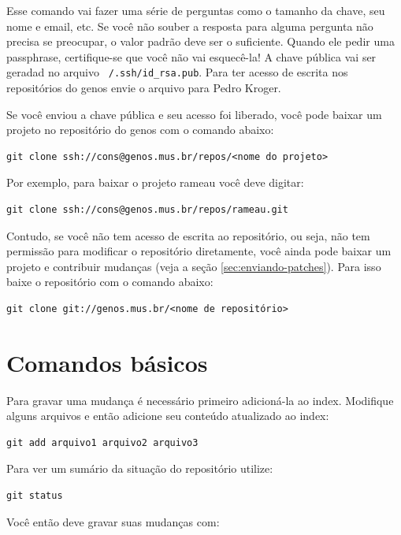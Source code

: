 \documentclass[12pt,brazil]{book}
\begin{document}
Esse comando vai fazer uma série de perguntas como o tamanho da chave,
seu nome e email, etc. Se você não souber a resposta para alguma
pergunta não precisa se preocupar, o valor padrão deve ser o
suficiente. Quando ele pedir uma passphrase, certifique-se que você
não vai esquecê-la! A chave pública vai ser geradad no arquivo
\texttt{~/.ssh/id\_rsa.pub}. Para ter acesso de escrita nos
repositórios do genos envie o arquivo para Pedro Kroger.

Se você enviou a chave pública e seu acesso foi liberado, você pode
baixar um projeto no repositório do genos com o comando abaixo:

\begin{verbatim}
git clone ssh://cons@genos.mus.br/repos/<nome do projeto>
\end{verbatim}

Por exemplo, para baixar o projeto rameau você deve
digitar:

\begin{verbatim}
git clone ssh://cons@genos.mus.br/repos/rameau.git
\end{verbatim}

Contudo, se você não tem acesso de escrita ao repositório, ou seja,
não tem permissão para modificar o repositório diretamente, você ainda
pode baixar um projeto e contribuir mudanças (veja a seção
\ref{sec:enviando-patches}). Para isso baixe o repositório com o
comando abaixo:

\begin{verbatim}
git clone git://genos.mus.br/<nome de repositório>
\end{verbatim}

\section{Comandos básicos}
\label{sec:comandos-basicos}

Para gravar uma mudança é necessário primeiro adicioná-la ao
index. Modifique alguns arquivos e então adicione seu conteúdo
atualizado ao index:

\begin{verbatim}
git add arquivo1 arquivo2 arquivo3
\end{verbatim}

Para ver um sumário da situação do repositório utilize:

\begin{verbatim}
git status
\end{verbatim}

Você então deve gravar suas mudanças com:
\end{document}
